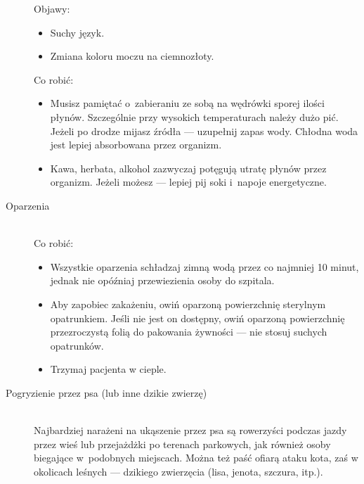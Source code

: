 \documentclass[a5paper,10pt,titlepage,twoside]{article}
\begin{document}
\begin{description}
Objawy:
\begin{itemize}
\item Suchy język.
\item Zmiana koloru moczu na ciemnozłoty.
\end{itemize}
\newpage
Co robić:
\begin{itemize}
\item Musisz pamiętać o~zabieraniu ze sobą na wędrówki sporej ilości płynów. Szczególnie przy wysokich temperaturach należy dużo pić. Jeżeli po drodze mijasz źródła --- uzupełnij zapas wody. Chłodna woda jest lepiej absorbowana przez organizm.
\item Kawa, herbata, alkohol zazwyczaj potęgują utratę płynów przez organizm. Jeżeli możesz --- lepiej pij soki i~napoje energetyczne.
\end{itemize}
\item[Oparzenia] \hfill \\ Co robić:
\begin{itemize}
\item Wszystkie oparzenia schładzaj zimną wodą przez co najmniej 10 minut, jednak nie opóźniaj przewiezienia osoby do szpitala.
\item Aby zapobiec zakażeniu, owiń oparzoną powierzchnię sterylnym opatrunkiem. Jeśli nie jest on dostępny, owiń oparzoną powierzchnię przezroczystą folią do pakowania żywności --- nie stosuj suchych opatrunków.
\item Trzymaj pacjenta w cieple.
\end{itemize}
\item[Pogryzienie przez psa (lub inne dzikie zwierzę)] \hfill \\ Najbardziej narażeni na ukąszenie przez psa są rowerzyści podczas jazdy przez wieś lub przejażdżki po terenach parkowych, jak również osoby biegające w~podobnych miejscach. Można też paść ofiarą ataku kota, zaś w okolicach leśnych --- dzikiego zwierzęcia (lisa, jenota, szczura, itp.).


\end{description}
\end{document}
